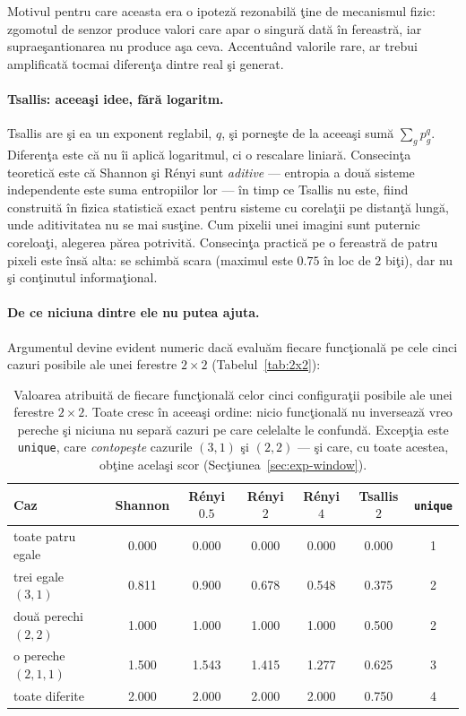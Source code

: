 Motivul pentru care aceasta era o ipoteză rezonabilă ţine de mecanismul fizic:
zgomotul de senzor produce valori care apar o singură dată în fereastră, iar
supraeşantionarea nu produce aşa ceva. Accentuând valorile rare, ar trebui
amplificată tocmai diferenţa dintre real şi generat.

\paragraph{Tsallis: aceeaşi idee, fără logaritm.} Tsallis are şi ea un exponent
reglabil, $q$, şi porneşte de la aceeaşi sumă $\sum_g p_g^{q}$. Diferenţa este că
nu îi aplică logaritmul, ci o rescalare liniară. Consecinţa teoretică este că
Shannon şi Rényi sunt \emph{aditive} --- entropia a două sisteme independente
este suma entropiilor lor --- în timp ce Tsallis nu este, fiind construită în
fizica statistică exact pentru sisteme cu corelaţii pe distanţă lungă, unde
aditivitatea nu se mai susţine. Cum pixelii unei imagini sunt puternic coreloaţi,
alegerea părea potrivită. Consecinţa practică pe o fereastră de patru pixeli
este însă alta: se schimbă scara (maximul este $0.75$ în loc de $2$ biţi), dar
nu şi conţinutul informaţional.

\paragraph{De ce niciuna dintre ele nu putea ajuta.} Argumentul devine evident
numeric dacă evaluăm fiecare funcţională pe cele cinci cazuri posibile ale unei
ferestre $2\times2$ (Tabelul~\ref{tab:2x2}):

\begin{table}[h]
  \centering
  \caption{Valoarea atribuită de fiecare funcţională celor cinci configuraţii
  posibile ale unei ferestre $2\times2$. Toate cresc în aceeaşi ordine: nicio
  funcţională nu inversează vreo pereche şi niciuna nu separă cazuri pe care
  celelalte le confundă. Excepţia este \texttt{unique}, care \emph{contopeşte}
  cazurile $(3,1)$ şi $(2,2)$ --- şi care, cu toate acestea, obţine acelaşi scor
  (Secţiunea~\ref{sec:exp-window}).}
  \label{tab:functionals-2x2}
  \begin{tabular}{lcccccc}
    \toprule
    Caz & Shannon & Rényi $0.5$ & Rényi $2$ & Rényi $4$ & Tsallis $2$ & \texttt{unique} \\
    \midrule
    toate patru egale   & 0.000 & 0.000 & 0.000 & 0.000 & 0.000 & 1 \\
    trei egale $(3,1)$  & 0.811 & 0.900 & 0.678 & 0.548 & 0.375 & 2 \\
    două perechi $(2,2)$& 1.000 & 1.000 & 1.000 & 1.000 & 0.500 & 2 \\
    o pereche $(2,1,1)$ & 1.500 & 1.543 & 1.415 & 1.277 & 0.625 & 3 \\
    toate diferite      & 2.000 & 2.000 & 2.000 & 2.000 & 0.750 & 4 \\
    \bottomrule
  \end{tabular}
\end{table}

